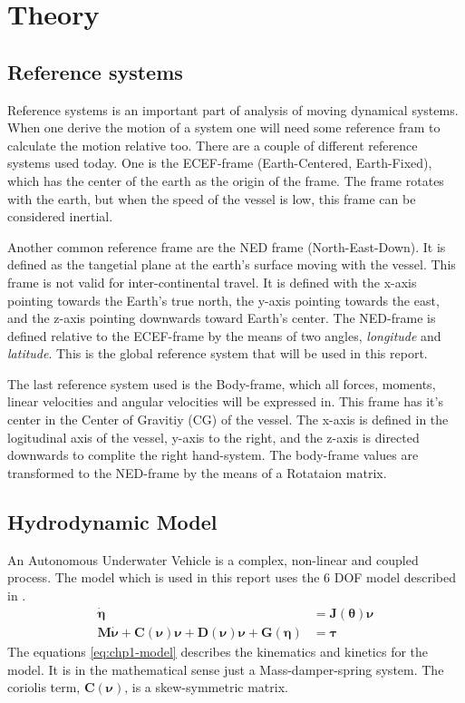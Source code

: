 \chapter{Theory}
	
\section{Reference systems}
	Reference systems is an important part of analysis of moving dynamical systems. When one derive the motion of a system one will need some reference fram to calculate the motion relative too. There are a couple of different reference systems used today. One is the ECEF-frame (Earth-Centered, Earth-Fixed), which has the center of the earth as the origin of the frame. The frame rotates with the earth, but when the speed of the vessel is low, this frame can be considered inertial. \cite{forsell}
	
	Another common reference frame are the NED frame (North-East-Down). It is defined as the tangetial plane at the earth's surface moving with the vessel. This frame is not valid for inter-continental travel. It is defined with the x-axis pointing towards the Earth's true north, the y-axis pointing towards the east, and the z-axis pointing downwards toward Earth's center. The NED-frame is defined relative to the ECEF-frame by the means of two angles, \textit{longitude} and \textit{latitude}. This is the global reference system that will be used in this report. \cite{fossen}
	
	The last reference system used is the Body-frame, which all forces, moments, linear velocities and angular velocities will be expressed in. This frame has it's center in the Center of Gravitiy (CG) of the vessel. The x-axis is defined in the logitudinal axis of the vessel, y-axis to the right, and the z-axis is directed downwards to complite the right hand-system. The body-frame values are transformed to the NED-frame by the means of a Rotataion matrix.
	
	

\section{Hydrodynamic Model}
	An Autonomous Underwater Vehicle is a complex, non-linear and coupled process. The model which is used in this report uses the 6 DOF model described in \cite{fossen}.
		\begin{align}
			\label{eq:chp1-model}
			\dot{\mathbf{\eta}} &= \mathbf{J}(\mathbf{\theta}) \mathbf{\nu} \\
			\mathbf{M} \dot{\mathbf{\nu}} + \mathbf{C}(\mathbf{\nu}) \mathbf{\nu} + \mathbf{D}(\mathbf{\nu}) \mathbf{\nu} + \mathbf{G}(\mathbf{\eta}) &= \mathbf{\tau} 
		\end{align}
	The equations \eqref{eq:chp1-model} describes the kinematics and kinetics for the model. It is in the mathematical sense just a Mass-damper-spring system. The coriolis term, $\mathbf{C}(\mathbf{\nu})$, is a skew-symmetric matrix.
	
